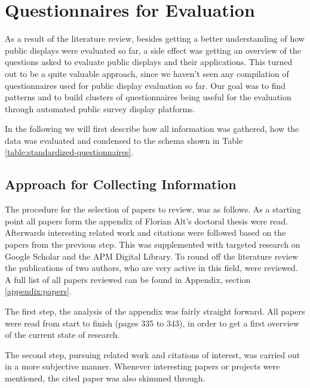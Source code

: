 \section{Questionnaires for Evaluation}
\label{sec:questionnaires}

As a result of the literature review, besides getting a better understanding of how public displays were evaluated so far, a side effect was getting an overview of the questions asked to evaluate public displays and their applications. This turned out to be a quite valuable approach, since we haven't seen any compilation of questionnaires used for public display evaluation so far. Our goal was to find patterns and to build clusters of questionnaires being useful for the evaluation through automated public survey display platforms.

In the following we will first describe how all information was gathered, how the data was evaluated and condensed to the schema shown in Table \ref{table:standardized-questionnaires}.





\subsection{Approach for Collecting Information}

	The procedure for the selection of papers to review, was as follows. As a starting point all papers form the appendix of Florian Alt's doctoral thesis \cite{alt2013thesis} were read. Afterwards interesting related work and citations were followed based on the papers from the previous step. This was supplemented with targeted research on Google Scholar and the APM Digital Library. To round off the literature review the publications of two authors, who are very active in this field, were reviewed. A full list of all papers reviewed can be found in Appendix, section \ref{appendix:papers}.

	The first step, the analysis of the appendix was fairly straight forward. All papers were read from start to finish (pages 335 to 343), in order to get a first overview of the current state of research.

	The second step, pursuing related work and citations of interest, was carried out in a more subjective manner. Whenever interesting papers or projects were mentioned, the cited paper was also skimmed through. 

